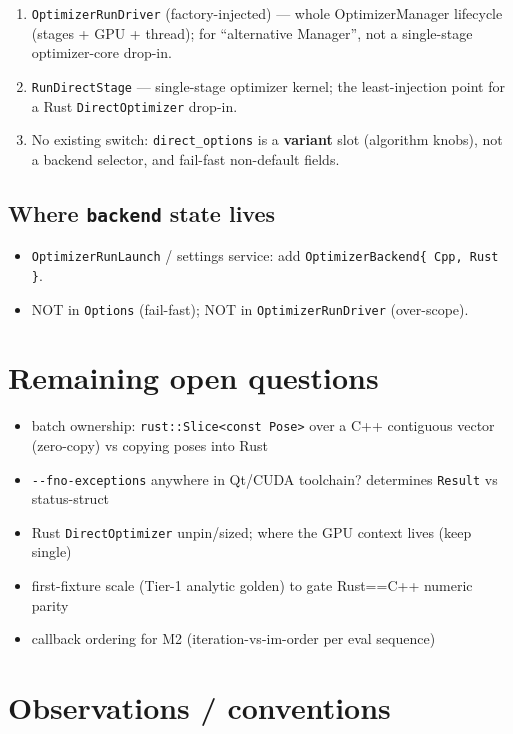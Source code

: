 \documentclass[11pt]{article}
\begin{document}
\begin{enumerate}
\item \texttt{OptimizerRunDriver} (factory-injected) — whole OptimizerManager lifecycle
(stages + GPU + thread); for ``alternative Manager'', not a single-stage
optimizer-core drop-in.
\item \texttt{RunDirectStage} — single-stage optimizer kernel; the least-injection point
for a Rust \texttt{DirectOptimizer} drop-in.
\item No existing switch: \texttt{direct\_options} is a \textbf{variant} slot (algorithm knobs),
not a backend selector, and fail-fast non-default fields.
\end{enumerate}
\subsection{Where \texttt{backend} state lives}
\label{sec:org80750e1}

\begin{itemize}
\item \texttt{OptimizerRunLaunch} / settings service: add \texttt{OptimizerBackend\{ Cpp, Rust \}}.
\item NOT in \texttt{Options} (fail-fast); NOT in \texttt{OptimizerRunDriver} (over-scope).
\end{itemize}
\section{Remaining open questions}
\label{sec:org4c5e7e5}

\begin{itemize}
\item batch ownership: \texttt{rust::Slice<const Pose>} over a C++ contiguous vector
(zero-copy) vs copying poses into Rust
\item \texttt{-{}-{}fno-exceptions} anywhere in Qt/CUDA toolchain? determines \texttt{Result} vs
status-struct
\item Rust \texttt{DirectOptimizer} unpin/sized; where the GPU context lives (keep single)
\item first-fixture scale (Tier-1 analytic golden) to gate Rust==C++ numeric parity
\item callback ordering for M2 (iteration-vs-im-order per eval sequence)
\end{itemize}
\section{Observations / conventions}
\label{sec:org4307221}
\end{document}
